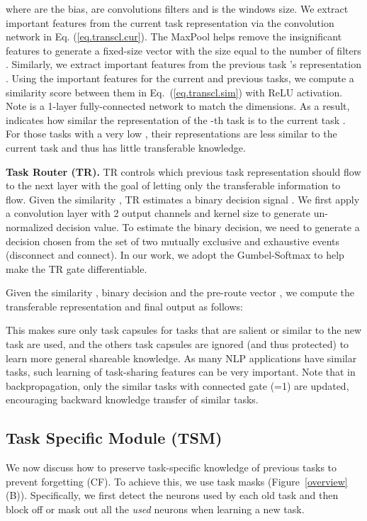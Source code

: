 \documentclass{article}
\begin{document}
{where  are the bias,  
are convolutions filters and  is the windows size. We extract important features from the current task representation  via the convolution network in Eq. (\ref{eq.transcl.cur}). The MaxPool helps remove the insignificant features to generate a fixed-size vector with the size equal to the number of filters . Similarly, we extract important features from the previous task 's representation . Using the important features for the current and previous tasks, we compute a similarity score between them in Eq.~(\ref{eq.transcl.sim}) with ReLU activation. Note  is a 1-layer fully-connected network to match the dimensions. As a result,  indicates how similar the representation of the -th task is to the current task . For those tasks with a very low , their representations are less similar to the current task and thus has little transferable knowledge. 

\textbf{Task Router (TR).} TR controls which previous task representation should flow to the next layer with the goal of letting only the transferable information to flow. Given the similarity , TR estimates a binary decision signal . We first apply a convolution layer with 2 output channels and  kernel size to generate un-normalized decision value. To estimate the binary decision, we need to generate a decision chosen from the set of two mutually exclusive and exhaustive events (disconnect and connect). In our work, we adopt the Gumbel-Softmax \cite{DBLP:conf/iclr/JangGP17} to help make the TR gate differentiable. 

Given the similarity , binary decision  and the pre-route vector , we compute the transferable representation  and final output  as follows: 

This makes sure only task capsules for tasks that are salient or similar to the new task are used, and the others task capsules are ignored (and thus protected) to learn more general shareable knowledge. As many NLP applications have similar tasks, such learning of task-sharing features can be very important. Note that in backpropagation, only the similar tasks with connected gate (=1) are updated, encouraging backward knowledge transfer of similar tasks.
}

\subsection{Task Specific Module (TSM)} 
We now discuss how to preserve task-specific knowledge of previous tasks to prevent forgetting (CF). To achieve this, we use task masks (Figure~\ref{overview}(B)). Specifically, we first detect the neurons used by each old task and then block off or mask out all the \textit{used} neurons when learning a new task. 
\end{document}
